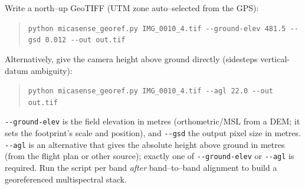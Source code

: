 \documentclass[10pt]{article}
\begin{document}
\noindent Write a north--up GeoTIFF (UTM zone auto--selected from the GPS):
\begin{quote}\small\verb|python micasense_georef.py IMG_0010_4.tif --ground-elev 481.5 --gsd 0.012 --out out.tif|\end{quote}

\noindent Alternatively, give the camera height above ground directly (sidesteps vertical-datum ambiguity):
\begin{quote}\small\verb|python micasense_georef.py IMG_0010_4.tif --agl 22.0 --out out.tif|\end{quote}

\noindent\verb|--ground-elev| is the field elevation in metres (orthometric/MSL from a DEM; it sets the footprint's scale and position), and \verb|--gsd| the output pixel size in metres. \verb|--agl| is an alternative that gives the absolute height above ground in metres (from the flight plan or other source); exactly one of \verb|--ground-elev| or \verb|--agl| is required. Run the script per band \emph{after} band--to--band alignment to build a georeferenced multispectral stack.
\end{document}

